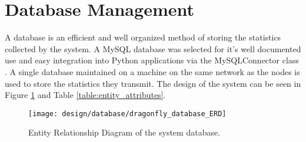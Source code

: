 \section{Database Management}

A database is an efficient and well organized method of storing the statistics collected by the system. A MySQL database was selected for it's 
well documented use and easy integration into Python applications via the MySQLConnector class \cite{mysqlconnector}. A single database maintained on a machine on the same network as the nodes is used to store the statistics they transmit. The design of the system can be seen in Figure \ref{fig:erd} and Table \ref{table:entity_attributes}.

\begin{figure}[H]
    \centering
    \centering\texttt{[image: design/database/dragonfly\_database\_ERD]}
    \caption{Entity Relationship Diagram of the system database.}
    \label{fig:erd}
  \end{figure}

